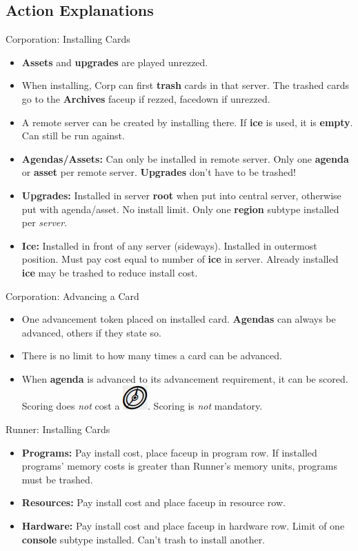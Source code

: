 \documentclass[12pt]{article}
\newenvironment{itemizeCustom}
{\begin{itemize}
  \setlength{\itemsep}{1pt}
  \setlength{\parskip}{0pt}
  \setlength{\parsep}{0pt}}
{\end{itemize}}
\newcommand{\action}{\includegraphics[scale=0.40]{images/actionLarge.jpg}\hspace{0.3em}}
\begin{document}
\begin{multicols*}{2}
\section*{Action Explanations}
Corporation: Installing Cards
\begin{itemizeCustom}
	\item \textbf{Assets} and \textbf{upgrades} are played unrezzed. 
	\item When installing, Corp can first \textbf{trash} cards in that server. The trashed cards go to the \textbf{Archives} faceup if rezzed, facedown if unrezzed.
	\item A remote server can be created by installing there. If \textbf{ice} is used, it is \textbf{empty}. Can still be run against.
	\item \textbf{Agendas/Assets:} Can only be installed in remote server. Only one \textbf{agenda} or \textbf{asset} per remote server. \textbf{Upgrades} don't have to be trashed!
	\item \textbf{Upgrades:} Installed in server \textbf{root} when put into central server, otherwise put with agenda/asset. No install limit. Only one \textbf{region} subtype installed per \emph{server}.
	\item \textbf{Ice:} Installed in front of any server (sideways). Installed in outermost position. Must pay cost equal to number of \textbf{ice} in server. Already installed \textbf{ice} may be trashed to reduce install cost.
\end{itemizeCustom}

Corporation: Advancing a Card
\begin{itemizeCustom}
	\item One advancement token placed on installed card. \textbf{Agendas} can always be advanced, others if they state so.
	\item There is no limit to how many times a card can be advanced. 
	\item When \textbf{agenda} is advanced to its advancement requirement, it can be scored. Scoring does \emph{not} cost a \action. Scoring is \emph{not} mandatory.
\end{itemizeCustom}

Runner: Installing Cards
\begin{itemizeCustom}
	\item \textbf{Programs:} Pay install cost, place faceup in program row. If installed programs' memory costs is greater than Runner's memory units, programs must be trashed.
	\item \textbf{Resources:} Pay install cost and place faceup in resource row.
	\item \textbf{Hardware:} Pay install cost and place faceup in hardware row. Limit of one \textbf{console} subtype installed. Can't trash to install another.
\end{itemizeCustom}


\end{multicols*}
\end{document}
